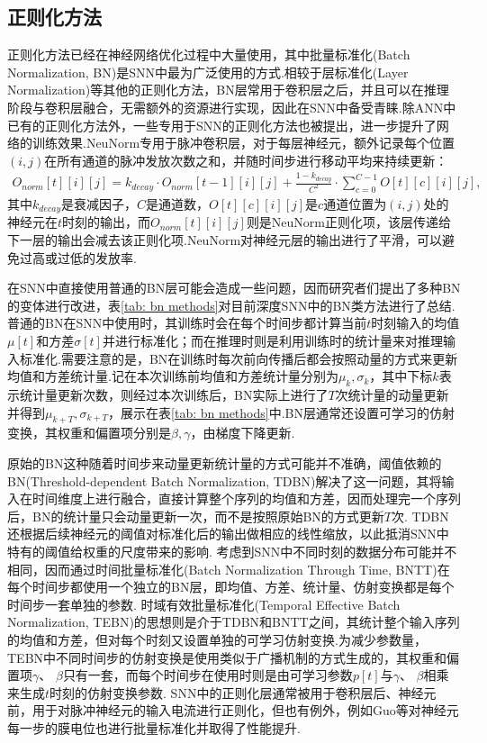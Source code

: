 \documentclass{SCIS2020cn}
\begin{document}
\subsection{正则化方法}%
正则化方法已经在神经网络优化过程中大量使用，其中批量标准化(Batch Normalization, BN)\cite{ioffe2015batch}是SNN中最为广泛使用的方式.相较于层标准化(Layer Normalization)\cite{ba2016layer}等其他的正则化方法，BN层常用于卷积层之后，并且可以在推理阶段与卷积层融合，无需额外的资源进行实现，因此在SNN中备受青睐.除ANN中已有的正则化方法外，一些专用于SNN的正则化方法也被提出，进一步提升了网络的训练效果.NeuNorm\cite{neunorm}专用于脉冲卷积层，对于每层神经元，额外记录每个位置$(i, j)$在所有通道的脉冲发放次数之和，并随时间步进行移动平均来持续更新：
\begin{eqnarray}
O_{norm}[t][i][j] = k_{decay} \cdot O_{norm}[t-1][i][j] + \frac{1 - k_{decay}}{C^{2}} \cdot \sum_{c=0}^{C-1}O[t][c][i][j],
\end{eqnarray}
其中$k_{decay}$是衰减因子，$C$是通道数，$O[t][c][i][j]$是$c$通道位置为$(i, j)$处的神经元在$t$时刻的输出，而$O_{norm}[t][i][j]$则是NeuNorm正则化项，该层传递给下一层的输出会减去该正则化项.NeuNorm对神经元层的输出进行了平滑，可以避免过高或过低的发放率.

在SNN中直接使用普通的BN层可能会造成一些问题，因而研究者们提出了多种BN的变体进行改进，表\ref{tab: bn methods}对目前深度SNN中的BN类方法进行了总结.
普通的BN在SNN中使用时，其训练时会在每个时间步都计算当前$t$时刻输入的均值$\mu[t]$和方差$\sigma[t]$并进行标准化；而在推理时则是利用训练时的统计量来对推理输入标准化.需要注意的是，BN在训练时每次前向传播后都会按照动量的方式来更新均值和方差统计量.记在本次训练前均值和方差统计量分别为$\mu_{k},\sigma_{k}$，其中下标$k$表示统计量更新次数，则经过本次训练后，BN实际上进行了$T$次统计量的动量更新并得到$\mu_{k+T},\sigma_{k+T}$，展示在表\ref{tab: bn methods}中.BN层通常还设置可学习的仿射变换，其权重和偏置项分别是$\beta,\gamma$，由梯度下降更新.

原始的BN这种随着时间步来动量更新统计量的方式可能并不准确，阈值依赖的BN(Threshold-dependent Batch Normalization, TDBN)\cite{zheng2020going}解决了这一问题，其将输入在时间维度上进行融合，直接计算整个序列的均值和方差，因而处理完一个序列后，BN的统计量只会动量更新一次，而不是按照原始BN的方式更新$T$次.
TDBN还根据后续神经元的阈值对标准化后的输出做相应的线性缩放，以此抵消SNN中特有的阈值给权重的尺度带来的影响.
考虑到SNN中不同时刻的数据分布可能并不相同，因而通过时间批量标准化(Batch Normalization Through Time, BNTT)\cite{10.3389/fnins.2021.773954}在每个时间步都使用一个独立的BN层，即均值、方差、统计量、仿射变换都是每个时间步一套单独的参数.
时域有效批量标准化(Temporal Effective Batch Normalization, TEBN)\cite{duan2022temporal}的思想则是介于TDBN和BNTT之间，其统计整个输入序列的均值和方差，但对每个时刻又设置单独的可学习仿射变换.为减少参数量，TEBN中不同时间步的仿射变换是使用类似于广播机制的方式生成的，其权重和偏置项$\gamma$、 $\beta$只有一套，而每个时间步在使用时则是由可学习参数$p[t]$与$\gamma$、 $\beta$相乘来生成$t$时刻的仿射变换参数.
SNN中的正则化层通常被用于卷积层后、神经元前，用于对脉冲神经元的输入电流进行正则化，但也有例外，例如Guo等\cite{Guo_2023_ICCV_mpbn}对神经元每一步的膜电位也进行批量标准化并取得了性能提升.
\end{document}
